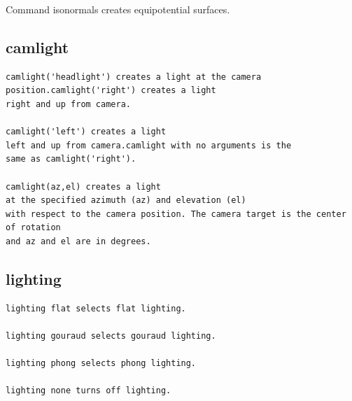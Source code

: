 \documentclass{ximera}
\begin{document}
Command isonormals creates  equipotential surfaces. 
\subsection{camlight}

\begin{verbatim}
camlight('headlight') creates a light at the camera position.camlight('right') creates a light
right and up from camera.

camlight('left') creates a light
left and up from camera.camlight with no arguments is the
same as camlight('right').

camlight(az,el) creates a light
at the specified azimuth (az) and elevation (el)
with respect to the camera position. The camera target is the center of rotation
and az and el are in degrees.

\end{verbatim}



\subsection{lighting}


\begin{verbatim}
lighting flat selects flat lighting.

lighting gouraud selects gouraud lighting.

lighting phong selects phong lighting.

lighting none turns off lighting.
\end{verbatim}
\end{document}
